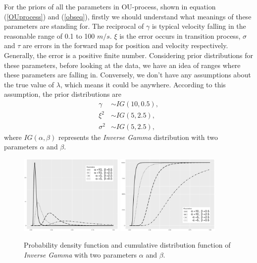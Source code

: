 For the priors of all the parameters in OU-process, shown in equation (\ref{OUprocess}) and (\ref{obseq}), firstly we should understand what meanings of these parameters are standing for. The reciprocal of $\gamma$ is typical velocity falling in the reasonable range of 0.1 to 100 $m/s$. $\xi$ is the error occurs in transition process, $\sigma$ and $\tau$ are errors in the forward map for position and velocity respectively. Generally, the error is a positive finite number. Considering prior distributions for these parameters, before looking at the data, we have an idea of ranges where these parameters are falling in. Conversely, we don't have any assumptions about the true value of $\lambda$, which means it could be anywhere. According to this assumption, the prior distributions are 
\begin{align*}
\gamma   &\sim IG(10,0.5),\\
\xi^2        &\sim IG(5,2.5),\\
\sigma^2 &\sim IG(5,2.5),
\end{align*}
where $IG(\alpha,\beta)$ represents the \textit{Inverse Gamma} distribution with two parameters $\alpha$ and $\beta$. 
\begin{figure}[h]
\centering
\includegraphics[width=0.45\textwidth]{Chapters/05MCMCOU/plots/ggIGPDF.pdf}
\includegraphics[width=0.45\textwidth]{Chapters/05MCMCOU/plots/ggIGCDF.pdf}
\caption{Probability density function and cumulative distribution function of \textit{Inverse Gamma} with two parameters $\alpha$ and $\beta$. }
\label{IGPDFCDF}
\end{figure}


